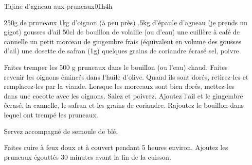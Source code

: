 \begin{recette}{Tajine d'agneau aux pruneaux}{0}{1h}{4h}
\begin{ingredients}
\ingredient 250g de pruneaux
\ingredient 1kg d’oignon (à peu près)
,5kg d’épaule d’agneau (je prends un gigot)
 gousses d'ail
\ingredient 50cl de bouillon de volaille (ou d'eau)
\ingredient une cuillère à café de cannelle
\ingredient un petit morceau de gingembre frais (équivalent en volume des gousses d'ail)
\ingredient une dosette de safran (1g)
\ingredient quelques grains de coriandre écrasé
\ingredient sel, poivre
\end{ingredients}

\begin{preparation}
\etape Faites tremper les 500 g pruneaux dans le bouillon (ou l'eau) chaud. 
\etape Faites revenir les oignons émincés dans l'huile d'olive. Quand ils sont dorés, retirez-les et remplacez-les par la viande.
\etape Lorsque les morceaux sont bien dorés, mettez-les dans une cocotte avec les oignons. Salez et poivrez. Ajoutez l'ail et le gingembre écrasé, 
la cannelle, le safran et les grains de coriandre.
\etape Rajoutez le bouillon dans lequel ont trempé les pruneaux.
\begin{remarque}
Servez accompagné de semoule de blé.
\end{remarque}
\end{preparation}

\begin{cuisson}
Faites cuire à feux doux et à couvert pendant 5 heures environ. Ajoutez les pruneaux égouttés 30 minutes avant la fin de la
cuisson.
\end{cuisson}

\end{recette}

